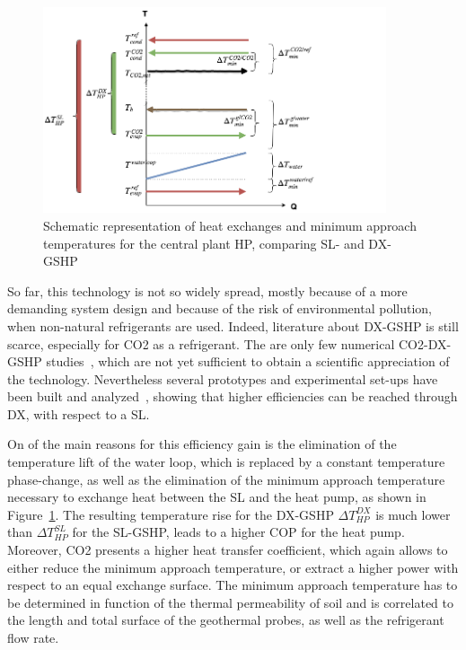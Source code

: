 \documentclass{article}
\begin{document}
\begin{figure}[htp]
	\centering
	\includegraphics[width=0.9\textwidth]{Qt_dx.png}
	\caption{Schematic representation of heat exchanges and minimum approach temperatures for the central plant HP, comparing SL- and DX-GSHP}
	\label{fig:Qt_dx}
\end{figure}

So far, this technology is not so widely spread, mostly because of a more demanding system design and because of the risk of environmental pollution, when non-natural refrigerants are used. Indeed, literature about DX-GSHP is still scarce, especially for CO2 as a refrigerant. The are only few numerical CO2-DX-GSHP studies~\cite{eslami-nejadModelingTwophaseCO2filled2014,ghazizade-ahsaeeEnergyExergyInvestigation2018,austinParametricStudyPerformance2011,eslami-nejadQuasitransientModelTranscritical2015}, which are not yet sufficient to obtain a scientific appreciation of the technology. Nevertheless several prototypes and experimental set-ups have been built and analyzed~\cite{eslami-nejadDetailedTheoreticalCharacterization2018, badacheExperimentalStudyCarbon2018, guoTechnoeconomicComparisonDirect2012}, showing that higher efficiencies can be reached through DX, with respect to a SL.

On of the main reasons for this efficiency gain is the elimination of the temperature lift of the water loop, which is replaced by a constant temperature phase-change, as well as the elimination of the minimum approach temperature necessary to exchange heat between the SL and the heat pump, as shown in Figure~\ref{fig:Qt_dx}. The resulting temperature rise for the DX-GSHP $\Delta T_{HP}^{DX}$ is much lower than $\Delta T_{HP}^{SL}$ for the SL-GSHP, leads to a higher COP for the heat pump. 
Moreover, CO2 presents a higher heat transfer coefficient, which again allows to either reduce the minimum approach temperature, or extract a higher power with respect to an equal exchange surface. The minimum approach temperature has to be determined in function of the thermal permeability of soil and is correlated to the length and total surface of the geothermal probes, as well as the refrigerant flow rate.
\end{document}
